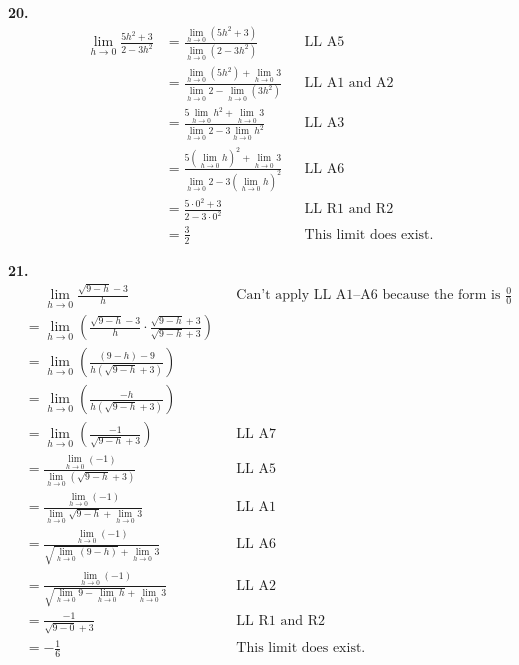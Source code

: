 \documentclass[12pt,]{book}
\theoremstyle{plain}
\theoremstyle{definition}
\numberwithin{equation}{section}
\begin{document}
\noindent\textbf{20.}\quad{}\begin{align*}
\lim\limits_{h\to0}\frac{5h^2+3}{2-3h^2}&=\frac{\lim\limits_{h\to0}\left(5h^2+3\right)}{\lim\limits_{h\to0}\left(2-3h^2\right)}&&\text{LL A5}\\
&=\frac{\lim\limits_{h\to0}\left(5h^2\right)+\lim\limits_{h\to0}3}{\lim\limits_{h\to0}2-\lim\limits_{h\to0}\left(3h^2\right)}&&\text{LL A1 and A2}\\
&=\frac{5\lim\limits_{h\to0}h^2+\lim\limits_{h\to0}3}{\lim\limits_{h\to0}2-3\lim\limits_{h\to0}h^2}&&\text{LL A3}\\
&=\frac{5\left(\lim\limits_{h\to0}h\right)^2+\lim\limits_{h\to0}3}{\lim\limits_{h\to0}2-3\left(\lim\limits_{h\to0}h\right)^2}&&\text{LL A6}\\
&=\frac{5\cdot0^2+3}{2-3\cdot0^2}&&\text{LL R1 and R2}\\
&=\frac{3}{2}&&\text{This limit does exist.}
\end{align*}%
\par\smallskip
\noindent\textbf{21.}\quad{}\begin{align*}
&\phantom{={}}\lim\limits_{h\to0}\frac{\sqrt{9-h}-3}{h}&&\text{Can't apply LL A1--A6 because the form is $\tfrac{0}{0}$}\\
&=\lim\limits_{h\to0}\left(\frac{\sqrt{9-h}-3}{h}\cdot\frac{\sqrt{9-h}+3}{\sqrt{9-h}+3}\right)\\
&=\lim\limits_{h\to0}\left(\frac{(9-h)-9}{h\left(\sqrt{9-h}+3\right)}\right)\\
&=\lim\limits_{h\to0}\left(\frac{-h}{h\left(\sqrt{9-h}+3\right)}\right)\\
&=\lim\limits_{h\to0}\left(\frac{-1}{\sqrt{9-h}+3}\right)&&\text{LL A7}\\
&=\frac{\lim\limits_{h\to0}(-1)}{\lim\limits_{h\to0}\left(\sqrt{9-h}+3\right)}&&\text{LL A5}\\
&=\frac{\lim\limits_{h\to0}(-1)}{\lim\limits_{h\to0}\sqrt{9-h}+\lim\limits_{h\to0}3}&&\text{LL A1}\\
&=\frac{\lim\limits_{h\to0}(-1)}{\sqrt{\lim\limits_{h\to0}(9-h)}+\lim\limits_{h\to0}3}&&\text{LL A6}\\
&=\frac{\lim\limits_{h\to0}(-1)}{\sqrt{\lim\limits_{h\to0}9-\lim\limits_{h\to0}h}+\lim\limits_{h\to0}3}&&\text{LL A2}\\
&=\frac{-1}{\sqrt{9-0}+3}&&\text{LL R1 and R2}\\
&=-\frac{1}{6}&&\text{This limit does exist.}
\end{align*}%
\par\smallskip
\end{document}
